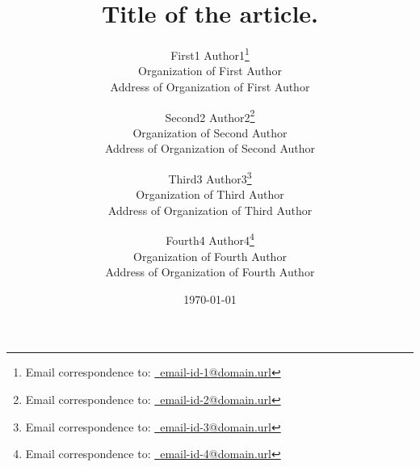 \documentclass[letter,12pt]{article}
\begin{document}
\title{Title of the article.}
\date{\today}
\author{
	First1 Author1\thanks{Email correspondence to: \href{mailto:email-id-1@domain.url}{\Email\ email-id-1@domain.url}} \\
		Organization of First Author\\
		Address of Organization of First Author
	\and
	Second2 Author2\thanks{Email correspondence to: \href{mailto:email-id-2@domain.url}{\Email\ email-id-2@domain.url}} \\
		Organization of Second Author\\
		Address of Organization of Second Author
	\and
	Third3 Author3\thanks{Email correspondence to: \href{mailto:email-id-3@domain.url}{\Email\ email-id-3@domain.url}} \\
		Organization of Third Author\\
		Address of Organization of Third Author
	\and
	Fourth4 Author4\thanks{Email correspondence to: \href{mailto:email-id-4@domain.url}{\Email\ email-id-4@domain.url}} \\
		Organization of Fourth Author\\
		Address of Organization of Fourth Author
}
\maketitle




%

\end{document}
